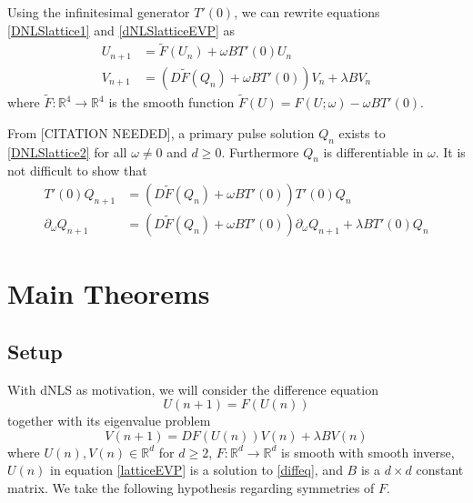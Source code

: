 \documentclass[12pt]{article}
\def\R{{\mathbb R}}
\begin{document}
Using the infinitesimal generator $T'(0)$, we can rewrite equations \eqref{DNLSlattice1} and \eqref{dNLSlatticeEVP} as
\begin{align}
U_{n+1} &= \tilde{F}(U_n) + \omega B T'(0) U_n \label{DNLSlattice2} \\
V_{n+1} &= (D\tilde{F}(Q_n) + \omega B T'(0)) V_n + \lambda B V_n \label{dNLSlatticeEVP2} 
\end{align}
where $\tilde{F}:\R^4 \rightarrow \R^4$ is the smooth function $\tilde{F}(U) = F(U; \omega) - \omega B T'(0)$. 

From [CITATION NEEDED], a primary pulse solution $Q_n$ exists to \eqref{DNLSlattice2} for all $\omega \neq 0$ and $d \geq 0$. Furthermore $Q_n$ is differentiable in $\omega$. It is not difficult to show that
\begin{align*}
T'(0) Q_{n+1} &= (D\tilde{F}(Q_n) + \omega B T'(0)) T'(0) Q_n \\
\partial_\omega Q_{n+1} &= (D\tilde{F}(Q_n) + \omega B T'(0)) \partial_\omega Q_{n+1} + \lambda B T'(0) Q_n
\end{align*}

\section{Main Theorems}

\subsection{Setup}

With dNLS as motivation, we will consider the difference equation
\begin{equation}\label{diffeq}
U(n+1) = F(U(n))
\end{equation}
together with its eigenvalue problem
\begin{equation}\label{latticeEVP}
V(n+1) = DF(U(n)) V(n) + \lambda B V(n)
\end{equation}
where $U(n), V(n) \in \R^d$ for $d \geq 2$, $F: \R^d \rightarrow \R^d$ is smooth with smooth inverse, $U(n)$ in equation \eqref{latticeEVP} is a solution to \eqref{diffeq}, and $B$ is a $d \times d$ constant matrix. We take the following hypothesis regarding symmetries of $F$.
\end{document}
